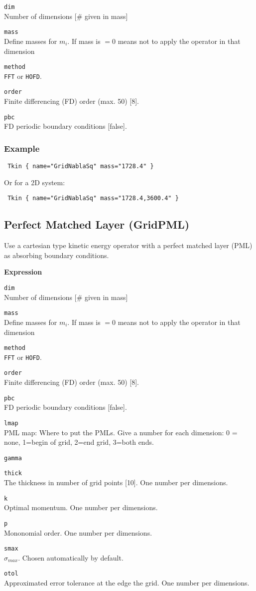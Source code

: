 \documentclass[a4paper,12pt]{scrbook}
\newcommand{\option}[2]{\item \texttt{#1}\\ #2}
\newcommand{\code}[1]{\texttt{#1}}
\begin{document}
\begin{options}
 \option{dim}{Number of dimensions [\# given in mass]}
 \option{mass}{Define masses for $m_i$. If mass is $= 0$ means not to apply the operator in that dimension}
 \option{method}{\code{FFT} or \code{HOFD}.}
 \option{order}{Finite differencing (FD) order (max. 50) [8].}
 \option{pbc}{FD periodic boundary conditions [false].}
\end{options}

\subsubsection*{Example}
\begin{verbatim}
 Tkin { name="GridNablaSq" mass="1728.4" }
\end{verbatim}

Or for a 2D system:
\begin{verbatim}
 Tkin { name="GridNablaSq" mass="1728.4,3600.4" }
\end{verbatim}


\subsection{Perfect Matched Layer (GridPML)}
Use a cartesian type kinetic energy operator with a perfect matched layer (PML) \cite{Nissen10} as
absorbing boundary conditions.

\textbf{Expression}

\begin{options}
 \option{dim}{Number of dimensions [\# given in mass]}
 \option{mass}{Define masses for $m_i$. If mass is $= 0$ means not to apply the operator in that dimension}
 \option{method}{\code{FFT} or \code{HOFD}.}
 \option{order}{Finite differencing (FD) order (max. 50) [8].}
 \option{pbc}{FD periodic boundary conditions [false].}
 \option{lmap}{PML map: Where to put the PMLs. Give a number for each dimension: 0 = none, 1=begin of grid, 2=end grid, 3=both ends.}
 \option{gamma}{}
 \option{thick}{The thickness in number of grid points [10]. One number per dimensions.}
 \option{k}{Optimal momentum. One number per dimensions.}
 \option{p}{Mononomial order. One number per dimensions.}
 \option{smax}{$\sigma_{max}$. Chosen automatically by default.}
 \option{otol}{Approximated error tolerance at the edge the grid. One number per dimensions.}
\end{options}
\end{document}
